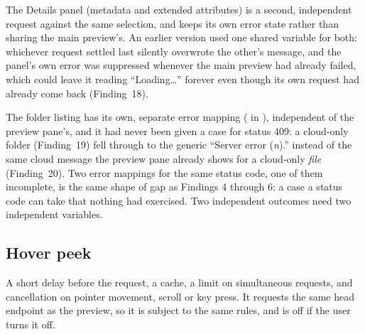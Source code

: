 The Details panel (metadata and extended attributes) is a second, independent request
against the same selection, and keeps its own error state rather than sharing the main
preview's.  An earlier version used one shared variable for both: whichever request
settled last silently overwrote the other's message, and the panel's own error was
suppressed whenever the main preview had already failed, which could leave it reading
``Loading…'' forever even though its own request had already come back (Finding~18).

The folder listing has its own, separate error mapping ( in
), independent of the preview pane's, and it had never been given a case
for status 409: a cloud-only folder (Finding~19) fell through to the generic ``Server
error (\emph{n}).'' instead of the same cloud message the preview pane already shows for
a cloud-only \emph{file} (Finding~20).  Two error mappings for the same status code, one
of them incomplete, is the same shape of gap as Findings 4 through 6: a case a status code
can take that nothing had exercised.
Two independent outcomes need two independent variables.

\subsection{Hover peek}

A short delay before the request, a cache, a limit on simultaneous requests, and cancellation
on pointer movement, scroll or key press.  It requests the same head endpoint as the preview,
so it is subject to the same rules, and is off if the user turns it off.
